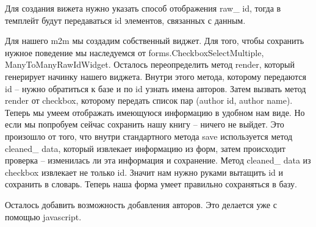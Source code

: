 \documentclass[a4paper]{report}
\begin{document}
Для создания вижета нужно указать способ отображения raw\_ id, тогда в темплейт будут передаваться id элементов, связанных с данным. 


 Для нашего m2m мы создадим собственный виджет. Для того, чтобы сохранить нужное поведение мы наследуемся от forms.CheckboxSelectMultiple, ManyToManyRawIdWidget. Осталось переопределить метод render, который генерирует начинку нашего виджета. Внутри этого метода, которому передаются id -- нужно обратиться к  базе и по id узнать имена авторов. Затем вызвать метод render от checkbox, которому передать список пар (author id, author name). 
Теперь мы умеем отображать имеющуюся информацию в удобном нам виде. Но если мы попробуем сейчас сохранить нашу книгу -- ничего не выйдет. Это произошло от того, что внутри стандартного метода save используется метод cleaned\_ data, который извлекает информацию из форм, затем происходит проверка -- изменилась ли эта информация и сохранение. Метод cleaned\_ data из checkbox извлекает не только id. Значит нам нужно руками вытащить id и сохранить в словарь. Теперь наша форма умеет правильно сохраняться в базу. 

Осталось добавить возможность добавления авторов. Это делается уже с помощью  javascript. 

 

\end{document}
